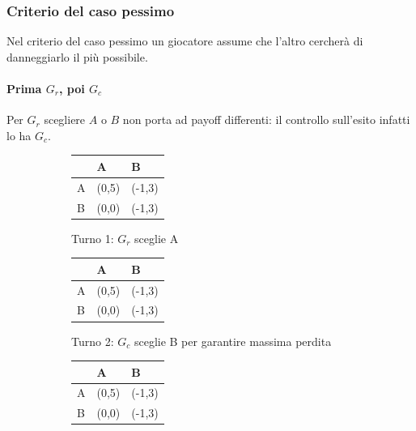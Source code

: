 \documentclass[\main/main.tex]{subfiles}
\begin{document}
\subsubsection*{Criterio del caso pessimo}
Nel criterio del caso pessimo un giocatore assume che l'altro cercherà di danneggiarlo il più possibile.
\paragraph*{Prima $G_r$, poi $G_c$}
Per $G_r$ scegliere $A$ o $B$ non porta ad payoff differenti: il controllo sull'esito infatti lo ha $G_c$.

\begin{figure}
  \begin{subfigure}{0.24\textwidth}
      \begin{tabular}{|L|L|L|}
        \hline
          & A                         & B                          \\
        \hline
        A &  (0,5) &  (-1,3) \\
        \hline
        B & (0,0)                     & (-1,3)                     \\
        \hline
      \end{tabular}
    \caption{Turno 1: $G_r$ sceglie A}
  \end{subfigure}
  \begin{subfigure}{0.24\textwidth}
      \begin{tabular}{|L|L|L|}
        \hline
          & A                         & B                            \\
        \hline
        A &  (0,5) &  (-1,3) \\
        \hline
        B & (0,0)                     &  (-1,3)    \\
        \hline
      \end{tabular}
    \caption{Turno 2: $G_c$ sceglie B per garantire massima perdita}
  \end{subfigure}
  \begin{subfigure}{0.24\textwidth}
      \begin{tabular}{|L|L|L|}
        \hline
          & A                         & B                         \\
        \hline
        A & (0,5)                     & (-1,3)                    \\
        \hline
        B &  (0,0) & (-1,3) \\

\end{tabular}
\end{subfigure}
\end{figure}
\end{document}
